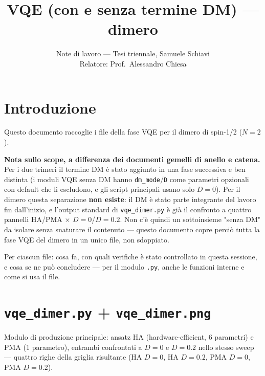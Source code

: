 \documentclass[11pt,a4paper]{article}
\title{VQE (con e senza termine DM) — dimero}
\author{Note di lavoro — Tesi triennale, Samuele Schiavi\\ Relatore: Prof.\ Alessandro Chiesa}
\date{}
\begin{document}
\maketitle

\section*{Introduzione}

Questo documento raccoglie i file della fase VQE per il dimero di spin-1/2 ($N=2$).

\textbf{Nota sullo scope, a differenza dei documenti gemelli di anello e catena.}
Per i due trimeri il termine DM è stato aggiunto in una fase successiva e ben
distinta (i moduli VQE senza DM hanno \texttt{dm\_mode}/\texttt{D} come parametri
opzionali con default che li escludono, e gli script principali usano solo $D=0$).
Per il dimero questa separazione \textbf{non esiste}: il DM è stato parte integrante
del lavoro fin dall'inizio, e l'output standard di \texttt{vqe\_dimer.py} è già il
confronto a quattro pannelli HA/PMA $\times$ $D{=}0$/$D{=}0.2$. Non c'è quindi un
sottoinsieme "senza DM" da isolare senza snaturare il contenuto — questo documento
copre perciò tutta la fase VQE del dimero in un unico file, non sdoppiato.

Per ciascun file: cosa fa, con quali verifiche è stato controllato in questa sessione,
e cosa se ne può concludere — per il modulo \texttt{.py}, anche le funzioni interne e
come si usa il file.

\section*{\texttt{vqe\_dimer.py} + \texttt{vqe\_dimer.png}}

Modulo di produzione principale: ansatz HA (hardware-efficient, 6 parametri) e PMA
(1 parametro), entrambi confrontati a $D=0$ e $D=0.2$ nello stesso sweep — quattro
righe della griglia risultante (HA $D{=}0$, HA $D{=}0.2$, PMA $D{=}0$, PMA $D{=}0.2$).
\end{document}
